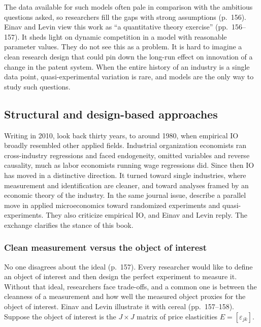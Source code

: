 The data available for such models often pale in comparison with the ambitious questions asked, so researchers
fill the gaps with strong assumptions (p.~156). Einav and Levin view this work as ``a quantitative theory
exercise'' (pp.~156--157). It sheds light on dynamic competition in a model with reasonable parameter values.
They do not see this as a problem. It is hard to imagine a clean research design that could pin down the
long-run effect on innovation of a change in the patent system. When the entire history of an industry is a
single data point, quasi-experimental variation is rare, and models are the only way to study such
questions.

\subsection{Structural and design-based approaches}\label{sec:01-today-debate}

Writing in 2010, \citet[p.~157]{EinavLevin2010} look back thirty years, to around 1980, when empirical IO broadly
resembled other applied fields. Industrial
organization economists ran cross-industry regressions and faced endogeneity, omitted variables and reverse
causality, much as labor economists running wage regressions did. Since then IO has moved in a distinctive
direction. It turned toward single industries, where measurement and identification are cleaner, and toward
analyses framed by an economic theory of the industry. In the same journal issue, \citet{AngristPischke2010}
describe a parallel move in applied microeconomics toward randomized experiments and quasi-experiments. They
also criticize empirical IO, and Einav and Levin reply. The exchange clarifies the stance of this book.

\subsubsection{Clean measurement versus the object of interest}

No one disagrees about the ideal (p.~157). Every researcher would like to define an object of interest and
then design the perfect experiment to measure it. Without that ideal, researchers face trade-offs, and a
common one is between the cleanness of a measurement and how well the measured object proxies for the object
of interest. Einav and Levin illustrate it with cereal (pp.~157--158). Suppose the object of interest is the
$J \times J$ matrix of price elasticities $E = [\varepsilon_{jk}]$.

